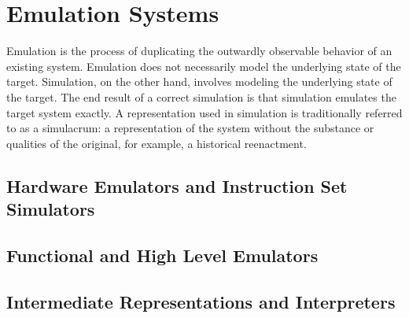 \chapter{Emulation Systems}

Emulation is the process of duplicating the outwardly observable behavior of an existing system.
Emulation does not necessarily model the underlying state of the target.
Simulation, on the other hand, involves modeling the underlying state of the target.
The end result of a correct simulation is that simulation emulates the target system exactly.
A representation used in simulation is traditionally referred to as a simulacrum: a representation of the system without the substance or qualities of the original, for example, a historical reenactment.

\section{Hardware Emulators and Instruction Set Simulators}

\section{Functional and High Level Emulators}

\section{Intermediate Representations and Interpreters}


